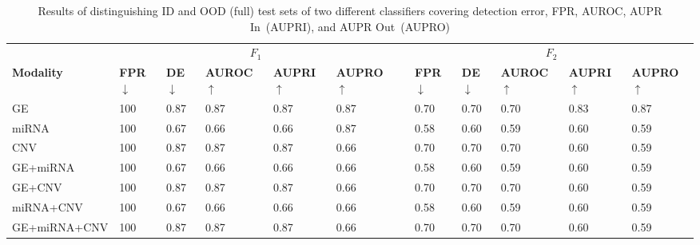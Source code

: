 \begin{table}[htp!]
	\centering
	\caption{Results of distinguishing ID and OOD (full) test sets of two different classifiers covering detection error, FPR, AUROC, AUPR In~(AUPRI), and AUPR Out~(AUPRO)} 
	\scriptsize{
	\vspace{-4mm}
	\begin{tabular}{llllllllllll}
		&\multicolumn{5}{c}{\bfseries{$F_1$}} && \multicolumn{5}{c}{\bfseries{$F_2$}} \\	
		\cmidrule{2-6}\cmidrule{8-12}   
		\textbf{Modality}&\textbf{FPR$\downarrow$} & \textbf{DE$\downarrow$} & \textbf{AUROC$\uparrow$} & \textbf{AUPRI$\uparrow$} & \textbf{AUPRO$\uparrow$}
		&& \textbf{FPR$\downarrow$} & \textbf{DE$\downarrow$} & \textbf{AUROC$\uparrow$} & \textbf{AUPRI$\uparrow$} & \textbf{AUPRO$\uparrow$}\\
		\hline
		\multirow{1}{*}{{GE}} & 100 & 0.87 & 0.87 & 0.87 & 0.87 && 0.70 & 0.70 & 0.70 & 0.83 & 0.87\\
		\hline
		\multirow{1}{*}{{miRNA}} & 100 & 0.67 & 0.66 & 0.66 & 0.87 && 0.58 & 0.60 & 0.59 & 0.60 & 0.59\\
		\hline
		\multirow{1}{*}{{CNV}} & 100 & 0.87 & 0.87 & 0.87 & 0.66 && 0.70 & 0.70 & 0.70 & 0.60 & 0.59\\
		\hline
		\multirow{1}{*}{{GE+miRNA}} & 100 & 0.67 & 0.66 & 0.66 & 0.66 && 0.58 & 0.60 & 0.59 & 0.60 & 0.59\\
		\hline
		\multirow{1}{*}{{GE+CNV}} & 100 & 0.87 & 0.87 & 0.87 & 0.66 && 0.70 & 0.70 & 0.70 & 0.60 & 0.59\\
		\hline
		\multirow{1}{*}{{miRNA+CNV}} & 100 & 0.67 & 0.66 & 0.66 & 0.66 && 0.58 & 0.60 & 0.59 & 0.60 & 0.59\\
		\hline
		\multirow{1}{*}{{GE+miRNA+CNV}} & 100 & 0.87 & 0.87 & 0.87 & 0.66 && 0.70 & 0.70 & 0.70 & 0.60 & 0.59\\
		\hline
	\end{tabular}}
	\vspace{-2mm}
	\label{Table:OOD_result_2}
\end{table}

